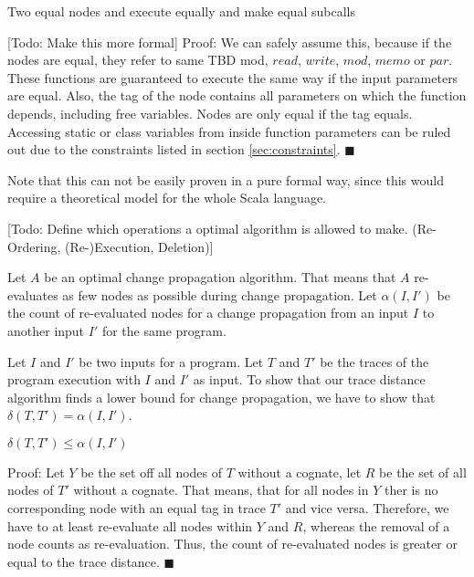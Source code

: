 \begin{lemma}
\label{lem:equalExec}
Two equal nodes and execute equally and make equal subcalls
\end{lemma}

[Todo: Make this more formal]
Proof: We can safely assume this, because if the nodes are equal, they refer to same TBD mod, $read$, $write$, $mod$, $memo$ or $par$. These functions are guaranteed to execute the same way if the input parameters are equal. Also, the tag of the node contains all parameters on which the function depends, including free variables. Nodes are only equal if the tag equals. Accessing static or class variables from inside function parameters can be ruled out due to the constraints listed in section \ref{sec:constraints}. $\blacksquare$

Note that this can not be easily proven in a pure formal way, since this would require a theoretical model for the whole Scala language. 

[Todo: Define which operations a optimal algorithm is allowed to make. (Re-Ordering, (Re-)Execution, Deletion)]
\begin{definition}
Let $A$ be an optimal change propagation algorithm. That means that $A$ re-evaluates as few nodes as possible during change propagation. 
Let $\alpha(I, I')$ be the count of re-evaluated nodes for a change propagation from an input $I$ to another input $I'$ for the same program. 
\end{definition}

Let $I$ and $I'$ be two inputs for a program. Let $T$ and $T'$ be the traces of the program execution with $I$ and $I'$ as input. 
To show that our trace distance algorithm finds a lower bound for change propagation, we have to show that $\delta(T, T') = \alpha(I, I')$. 

\begin{lemma}
\label{lem:alphaLeq}
$\delta(T, T') \leq \alpha(I, I')$
\end{lemma} 
Proof: Let $Y$ be the set off all nodes of $T$ without a cognate, let $R$ be the set of all nodes of $T'$ without a cognate. 
That means, that for all nodes in $Y$ ther is no corresponding node with an equal tag in trace $T'$ and vice versa. Therefore, we have to at least re-evaluate all nodes within $Y$ and $R$, whereas the removal of a node counts as re-evaluation. Thus, the count of re-evaluated nodes is greater or equal to the trace distance. $\blacksquare$

